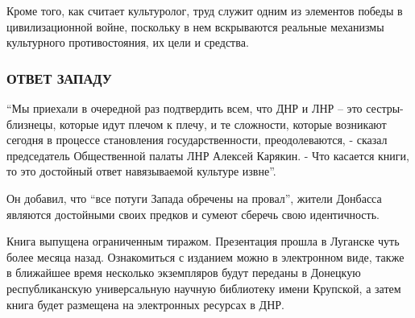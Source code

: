 Кроме того, как считает культуролог, труд служит одним из элементов победы в
цивилизационной войне, поскольку в нем вскрываются реальные механизмы
культурного противостояния, их цели и средства.

\subsubsection{ОТВЕТ ЗАПАДУ}

\enquote{Мы приехали в очередной раз подтвердить всем, что ДНР и ЛНР – это
сестры-близнецы, которые идут плечом к плечу, и те сложности, которые возникают
сегодня в процессе становления государственности, преодолеваются, - сказал
председатель Общественной палаты ЛНР Алексей Карякин. - Что касается книги, то
это достойный ответ навязываемой культуре извне}.

Он добавил, что \enquote{все потуги Запада обречены на провал}, жители Донбасса
являются достойными своих предков и сумеют сберечь свою идентичность.

Книга выпущена ограниченным тиражом. Презентация прошла в Луганске чуть более
месяца назад. Ознакомиться с изданием можно в электронном виде, также в
ближайшее время несколько экземпляров будут переданы в Донецкую республиканскую
универсальную научную библиотеку имени Крупской, а затем книга будет размещена
на электронных ресурсах в ДНР.
